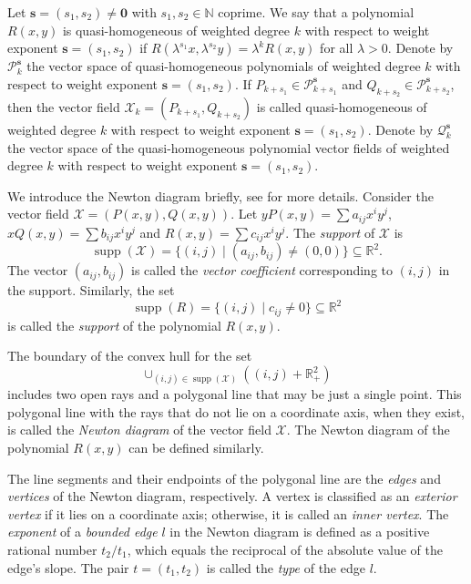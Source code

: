 \documentclass[reqno]{amsart}
\begin{document}
Let $\mathbf{s} = (s_{1},s_{2})\neq \boldsymbol{0} $ with $s_{1}, s_{2}\in\mathbb{N}$ 
coprime. We say that a polynomial $R(x,y)$ is quasi-homogeneous of weighted degree 
$k$ with respect to weight exponent $\mathbf{s} = (s_{1},s_{2})$ if 
$R(\lambda^{s_{1}}x,\lambda^{s_{2}}y)=\lambda^{k}R(x,y)$ for all $\lambda >0$. 
Denote by $\mathcal{P}_{k}^{\mathbf{s}}$ the vector space of quasi-homogeneous 
polynomials of weighted degree $k$ with respect to weight exponent 
$\mathbf{s} = (s_{1},s_{2})$. If $P_{k+s_{1}}\in \mathcal{P}_{k+s_{1}}^{\mathbf{s}}$ and 
$Q_{k+s_{2}}\in \mathcal{P}_{k+s_{2}}^{\mathbf{s}}$, then the vector field 
$\mathscr{X}_{k}=(P_{k+s_{1}},Q_{k+s_{2}})$ is called quasi-homogeneous of weighted 
degree $k$ with respect to weight exponent $\mathbf{s} = (s_{1},s_{2})$. 
Denote by $\mathcal{Q}_{k}^{\mathbf{s}}$ the vector space of the quasi-homogeneous 
polynomial vector fields of weighted degree $k$ with respect to weight exponent 
$\mathbf{s} = (s_{1},s_{2})$.

 We introduce the Newton diagram briefly, see \cite{bib 2, bib 5} for more details.
Consider the vector field $\mathscr{X}= (P(x,y), Q(x,y))$. 
Let $yP(x,y)=\sum a_{ij}x^{i}y^{j}$, $xQ(x,y)=\sum b_{ij}x^{i}y^{j}$ and 
$R(x,y)=\sum c_{ij}x^{i}y^{j}$. The \emph{support} of $\mathscr{X}$ is 
\[
\operatorname{supp}(\mathscr{X})=\{(i,j)\mid(a_{ij},b_{ij})\neq (0,0)\}
\subseteq \mathbb{R}^2.
\]
The vector $(a_{ij},b_{ij})$ is called the \emph{vector coefficient} corresponding to 
$(i,j)$ in the support. Similarly, the set
\[
\operatorname{supp}(R)=\{(i,j)\mid c_{ij}\neq 0\}\subseteq \mathbb{R}^2
\]
is called the \emph{support} of the polynomial $R(x,y)$.

The boundary of the convex hull for the set
$$
\cup_{(i,j)\in \operatorname{supp}(\mathscr{X})}((i,j)+\mathbb{R}_{+}^{2})
$$
includes two open rays and a polygonal line that may be just a single point. 
This polygonal line with the rays that do not lie on a coordinate axis, when they exist, 
is called the \emph{Newton diagram} of the vector field $\mathscr{X}$. 
The Newton diagram of the polynomial $R(x,y)$ can be defined similarly.

The line segments and their endpoints of the polygonal line are the \emph{edges} 
and \emph{vertices} of the Newton diagram, respectively. 
A vertex is classified as an \emph{exterior vertex} if it lies on a coordinate axis; 
otherwise, it is called an \emph{inner vertex}. The \emph{exponent} of a 
\emph{bounded edge} $l$ in the Newton diagram is defined as a positive rational number 
$t_2/t_1$, which equals the reciprocal of the absolute value of the edge's slope. 
The pair $t=(t_1,t_2)$ is called the \emph{type} of the edge $l$.
\end{document}
